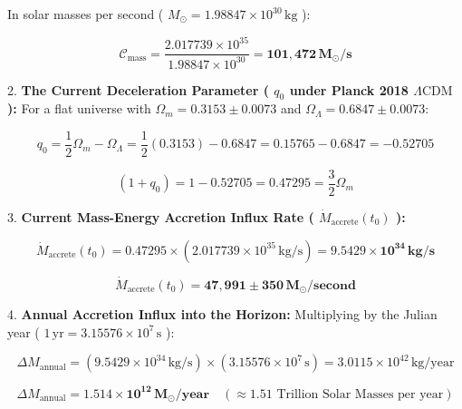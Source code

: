 \documentclass[11pt,a4paper]{article}
\theoremstyle{definition}
\theoremstyle{remark}
\begin{document}
In solar masses per second ( $M_\odot = 1.98847 \times 10^{30} \, \mathrm{kg}$ ):


\begin{equation}
\mathcal{C}_{\text{mass}} = \frac{2.017739 \times 10^{35}}{1.98847 \times 10^{30}} = \mathbf{101,472 \, M_\odot/s}
\end{equation}


2. \textbf{The Current Deceleration Parameter ( $q_0$ under Planck 2018 $\Lambda\text{CDM}$ ):}
For a flat universe with $\Omega_m = 0.3153 \pm 0.0073$ and $\Omega_\Lambda = 0.6847 \pm 0.0073$:


\begin{equation}
q_0 = \frac{1}{2}\Omega_m - \Omega_\Lambda = \frac{1}{2}(0.3153) - 0.6847 = 0.15765 - 0.6847 = \mathbf{-0.52705}
\end{equation}



\begin{equation}
(1 + q_0) = 1 - 0.52705 = \mathbf{0.47295} = \frac{3}{2}\Omega_m
\end{equation}


3. \textbf{Current Mass-Energy Accretion Influx Rate ( $\dot{M}_{\text{accrete}}(t_0)$ ):}


\begin{equation}
\dot{M}_{\text{accrete}}(t_0) = 0.47295 \times (2.017739 \times 10^{35} \, \mathrm{kg/s}) = \mathbf{9.5429 \times 10^{34} \, kg/s}
\end{equation}



\begin{equation}
\boxed{\dot{M}_{\text{accrete}}(t_0) = \mathbf{47,991 \pm 350 \, M_\odot / \text{second}}}
\end{equation}


4. \textbf{Annual Accretion Influx into the Horizon:}
Multiplying by the Julian year ( $1 \, \text{yr} = 3.15576 \times 10^7 \, \mathrm{s}$ ):


\begin{equation}
\Delta M_{\text{annual}} = (9.5429 \times 10^{34} \, \mathrm{kg/s}) \times (3.15576 \times 10^7 \, \mathrm{s}) = 3.0115 \times 10^{42} \, \mathrm{kg/year}
\end{equation}



\begin{equation}
\boxed{\Delta M_{\text{annual}} = \mathbf{1.514 \times 10^{12} \, M_\odot / \text{year}} \quad (\approx 1.51 \text{ Trillion Solar Masses per year})}
\end{equation}
\end{document}
